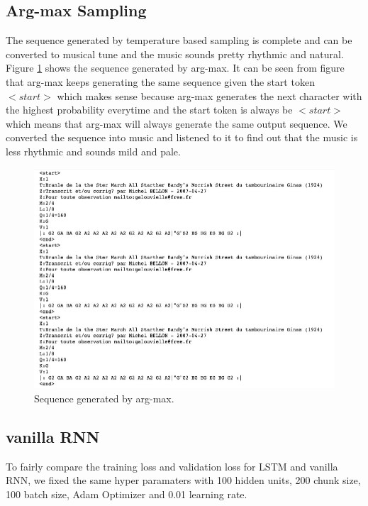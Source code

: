 \documentclass{article}
\begin{document}
\subsection{Arg-max Sampling}

The sequence generated by temperature based sampling is complete and can be converted to musical tune and the music sounds pretty rhythmic and natural. Figure \ref{d: argmax} shows the sequence generated by arg-max. It can be seen from figure that arg-max keeps generating the same sequence given the start token $<start>$ which makes sense because arg-max generates the next character with the highest probability everytime and the start token is always be $<start>$ which means that arg-max will always generate the same output sequence. We converted the sequence into music and listened to it to find out that the music is less rhythmic and sounds mild and pale.

\begin{figure}[H]
\begin{center}
  \centering
  \includegraphics[width=5in]{image/d_argmax.png}
\end{center}
\caption{Sequence generated by arg-max.}
\label{d: argmax}
\end{figure}

\subsection{vanilla RNN}

To fairly compare the training loss and validation loss for LSTM and vanilla RNN, we fixed the same hyper paramaters with 100 hidden units, 200 chunk size, 100 batch size, Adam Optimizer and 0.01 learning rate.
\end{document}
